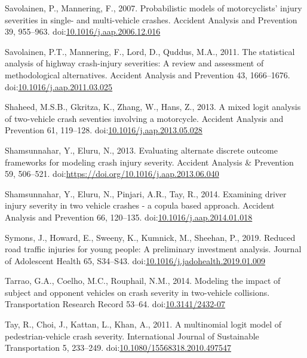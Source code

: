 \documentclass[]{elsarticle} %
\begin{document}
\leavevmode\hypertarget{ref-Savolainen2007probabilistic}{}%
Savolainen, P., Mannering, F., 2007. Probabilistic models of
motorcyclists' injury severities in single- and multi-vehicle crashes.
Accident Analysis and Prevention 39, 955--963.
doi:\href{https://doi.org/10.1016/j.aap.2006.12.016}{10.1016/j.aap.2006.12.016}

\leavevmode\hypertarget{ref-Savolainen2011statistical}{}%
Savolainen, P.T., Mannering, F., Lord, D., Quddus, M.A., 2011. The
statistical analysis of highway crash-injury severities: A review and
assessment of methodological alternatives. Accident Analysis and
Prevention 43, 1666--1676.
doi:\href{https://doi.org/10.1016/j.aap.2011.03.025}{10.1016/j.aap.2011.03.025}

\leavevmode\hypertarget{ref-Shaheed2013mixed}{}%
Shaheed, M.S.B., Gkritza, K., Zhang, W., Hans, Z., 2013. A mixed logit
analysis of two-vehicle crash seventies involving a motorcycle. Accident
Analysis and Prevention 61, 119--128.
doi:\href{https://doi.org/10.1016/j.aap.2013.05.028}{10.1016/j.aap.2013.05.028}

\leavevmode\hypertarget{ref-Shamsunnahar2013evaluating}{}%
Shamsunnahar, Y., Eluru, N., 2013. Evaluating alternate discrete outcome
frameworks for modeling crash injury severity. Accident Analysis \&
Prevention 59, 506--521.
doi:\href{https://doi.org/https://doi.org/10.1016/j.aap.2013.06.040}{https://doi.org/10.1016/j.aap.2013.06.040}

\leavevmode\hypertarget{ref-Shamsunnahar2014examining}{}%
Shamsunnahar, Y., Eluru, N., Pinjari, A.R., Tay, R., 2014. Examining
driver injury severity in two vehicle crashes - a copula based approach.
Accident Analysis and Prevention 66, 120--135.
doi:\href{https://doi.org/10.1016/j.aap.2014.01.018}{10.1016/j.aap.2014.01.018}

\leavevmode\hypertarget{ref-Symons2019reduced}{}%
Symons, J., Howard, E., Sweeny, K., Kumnick, M., Sheehan, P., 2019.
Reduced road traffic injuries for young people: A preliminary investment
analysis. Journal of Adolescent Health 65, S34--S43.
doi:\href{https://doi.org/10.1016/j.jadohealth.2019.01.009}{10.1016/j.jadohealth.2019.01.009}

\leavevmode\hypertarget{ref-Tarrao2014modeling}{}%
Tarrao, G.A., Coelho, M.C., Rouphail, N.M., 2014. Modeling the impact of
subject and opponent vehicles on crash severity in two-vehicle
collisions. Transportation Research Record 53--64.
doi:\href{https://doi.org/10.3141/2432-07}{10.3141/2432-07}

\leavevmode\hypertarget{ref-Tay2011multinomial}{}%
Tay, R., Choi, J., Kattan, L., Khan, A., 2011. A multinomial logit model
of pedestrian-vehicle crash severity. International Journal of
Sustainable Transportation 5, 233--249.
doi:\href{https://doi.org/10.1080/15568318.2010.497547}{10.1080/15568318.2010.497547}
\end{document}
